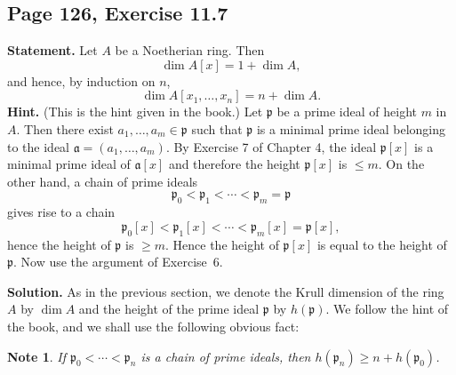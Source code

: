 \documentclass[parskip=half,fontsize=12pt]{scrartcl}%
\newcommand{\oo}{\operatorname}\newcommand{\ooo}{\operatorname*}
\newcommand{\mf}{\mathfrak}
\newcommand{\aaa}{\mf a}
\newcommand{\ppp}{\mf p}
\newtheorem{note}[thm]{Note}
\begin{document}
%
\begin{comment}
implies that, for any chain $\ppp_0<\ppp_1<\ppp_2$ of prime ideals in $A[x]$, we have:

$\bullet$ if $\ppp_0^{\oo c}=\ppp_1^{\oo c}$ then $\ppp_0=\ppp_0^{\oo c}[x]$ %
and $\ppp_1^{\oo c}<\ppp_2^{\oo c}$,

$\bullet$ if $\ppp_1^{\oo c}=\ppp_2^{\oo c}$ then $\ppp_1=\ppp_1^{\oo c}[x]$ %
and $\ppp_0^{\oo c}<\ppp_1^{\oo c}$.

This implies that a chain of length $\ell$ in $A[x]$ contracts to a chain of length at least $\lfloor\ell/2\rfloor$ in $A$. Hence 
$$
\left\lfloor\frac{\dim A[x]}2\right\rfloor\le\dim A,
$$ 
that is,
$$
\frac{\dim A[x]}2\le\frac12+\dim A.\ \square
$$
\end{comment}
%
\subsection{Page 126, Exercise 11.7}%

\textbf{Statement.} Let $A$ be a Noetherian ring. Then
\begin{equation}\label{dax}
\dim A[x]=1+\dim A,
\end{equation}
and hence, by induction on $n$,
$$
\dim A[x_1,\ldots,x_n]=n+\dim A.
$$ 
\textbf{Hint.} (This is the hint given in the book.) Let $\ppp$ be a prime ideal of height $m$ in $A$. Then there exist $a_1,\ldots,a_m\in\ppp$ such that $\ppp$ is a minimal prime ideal belonging to the ideal $\aaa=(a_1,\ldots,a_m)$. By Exercise 7 of Chapter 4, the ideal $\ppp[x]$ is a minimal prime ideal of $\aaa[x]$ and therefore the height $\ppp[x]$ is $\le m$. On the other hand, a chain of prime ideals 
$$
\ppp_0<\ppp_1<\cdots<\ppp_m=\ppp
$$ 
gives rise to a chain 
$$
\ppp_0[x]<\ppp_1[x]<\cdots<\ppp_m[x]=\ppp[x],
$$ 
hence the height of $\ppp$ is $\ge m$. Hence the height of $\ppp[x]$ is equal to the height of $\ppp$. Now use the argument of Exercise~6.

\textbf{Solution.} As in the previous section, we denote the Krull dimension of the ring $A$ by $\dim A$ and the height of the prime ideal $\ppp$ by $h(\ppp)$. We follow the hint of the book, and we shall use the following obvious fact: 

\begin{note}\label{116a}
If $\ppp_0<\cdots<\ppp_n$ is a chain of prime ideals, then $h(\ppp_n)\ge n+h(\ppp_0)$. 
\end{note}
\end{document}
